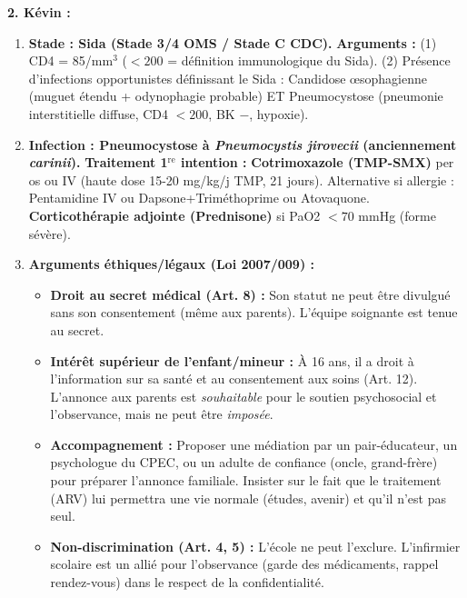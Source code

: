 \documentclass[11pt]{article}
\begin{document}
\begin{corrige}
\textbf{2. Kévin :}
\begin{enumerate}
    \item \textbf{Stade : Sida (Stade 3/4 OMS / Stade C CDC).}
    \textbf{Arguments :} (1) CD4 = 85/mm$^3$ ($< 200$ = définition immunologique du Sida). (2) Présence d'infections opportunistes définissant le Sida : Candidose œsophagienne (muguet étendu + odynophagie probable) ET Pneumocystose (pneumonie interstitielle diffuse, CD4 $< 200$, BK $-$, hypoxie).
    \item \textbf{Infection : Pneumocystose à \emph{Pneumocystis jirovecii} (anciennement \emph{carinii}).}
    \textbf{Traitement 1$^{\text{re}}$ intention :} \textbf{Cotrimoxazole (TMP-SMX)} per os ou IV (haute dose 15-20 mg/kg/j TMP, 21 jours). Alternative si allergie : Pentamidine IV ou Dapsone+Triméthoprime ou Atovaquone. \textbf{Corticothérapie adjointe (Prednisone)} si PaO2 $< 70$ mmHg (forme sévère).
    \item \textbf{Arguments éthiques/légaux (Loi 2007/009) :}
    \begin{itemize}
        \item \textbf{Droit au secret médical (Art. 8) :} Son statut ne peut être divulgué sans son consentement (même aux parents). L'équipe soignante est tenue au secret.
        \item \textbf{Intérêt supérieur de l'enfant/mineur :} À 16 ans, il a droit à l'information sur sa santé et au consentement aux soins (Art. 12). L'annonce aux parents est \emph{souhaitable} pour le soutien psychosocial et l'observance, mais ne peut être \emph{imposée}.
        \item \textbf{Accompagnement :} Proposer une médiation par un pair-éducateur, un psychologue du CPEC, ou un adulte de confiance (oncle, grand-frère) pour préparer l'annonce familiale. Insister sur le fait que le traitement (ARV) lui permettra une vie normale (études, avenir) et qu'il n'est pas seul.
        \item \textbf{Non-discrimination (Art. 4, 5) :} L'école ne peut l'exclure. L'infirmier scolaire est un allié pour l'observance (garde des médicaments, rappel rendez-vous) dans le respect de la confidentialité.
    \end{itemize}
\end{enumerate}
\end{corrige}
\end{document}
